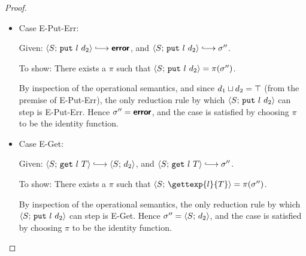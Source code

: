 \begin{proof}
\begin{itemize}
      \item Case {\sc E-Put-Err}:

      Given: $\config{S}{\putexp{l}{d_2}} \parstepsto \error$, and
      $\config{S}{\putexp{l}{d_2}} \parstepsto \conf''$.

      To show: There exists a $\pi$ such that
      $\langle S;\, \mbox{\texttt{put}}~l~d_2 \rangle = \pi(\sigma'')$.

      By inspection of the operational semantics, and since
      $d_1 \sqcup d_2 = \top$ (from the premise of {\sc
      E-Put-Err}), the only reduction rule by which
      $\langle S;\, \mbox{\texttt{put}}~l~d_2 \rangle$ can step is {\sc E-Put-Err}.
      Hence $\sigma'' = \textbf{\textsf{error}}$, and the case is satisfied by choosing
      $\pi$ to be the identity function.

      \item Case {\sc E-Get}:

      Given: $\config{S}{\getexp{l}{T}} \parstepsto \config{S}{d_2}$,
      and $\config{S}{\getexp{l}{T}} \parstepsto \conf''$.

      To show: There exists a $\pi$ such that
      $\config{S}{\gettexp{l}{T}} = \pi(\conf'')$.

      By inspection of the operational semantics, the only reduction
      rule by which $\langle S;\, \mbox{\texttt{put}}~l~d_2 \rangle$ can step is {\sc
      E-Get}.  Hence $\sigma'' = \langle S;\, d_2 \rangle$, and the case is
      satisfied by choosing $\pi$ to be the identity
      function.

  \end{itemize}
\end{proof}

